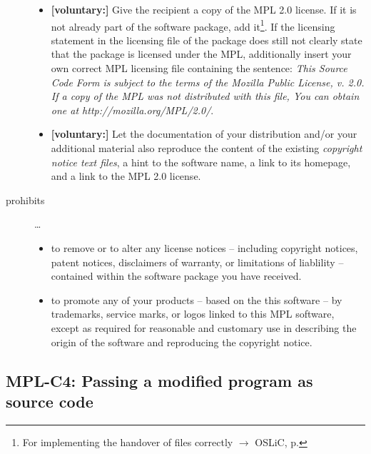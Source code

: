 \begin{description}
\begin{itemize}
  \item \textbf{[voluntary:]} Give the recipient a copy of the MPL 2.0 license.
  If it is not already part of the software package, add it\footnote{For
  implementing the handover of files correctly $\rightarrow$ OSLiC, p.
  \pageref{DistributingFilesHint}}. If the licensing statement in the licensing
  file of the package does still not clearly state that the package is licensed
  under the MPL, additionally insert your own correct MPL licensing file
  containing the sentence: \emph{This Source Code Form is subject to the terms
  of the Mozilla Public License, v. 2.0. If a copy of the MPL was not
  distributed with this file, You can obtain one at
  http://mozilla.org/MPL/2.0/}.
  
  \item \textbf{[voluntary:]} Let the documentation of your distribution and/or
  your additional material also reproduce the content of the existing
  \emph{copyright notice text files}, a hint to the software name, a link to its
  homepage, and a link to the MPL 2.0 license.
    
\end{itemize}

\item[prohibits] \ldots
\begin{itemize}
  \item to remove or to alter any license notices -- including copyright
  notices, patent notices, disclaimers of warranty, or limitations of liablility
  -- contained within the software package you have received.
  \item to promote any of your products -- based on the this software -- by
  trademarks, service marks, or logos linked to this MPL software, except as 
  required for reasonable and customary use in describing the origin
  of the software and reproducing the  copyright notice.
\end{itemize}

\end{description}

\subsection{MPL-C4: Passing a modified program as source code}
\label{OSUC-04S-MPL} 

